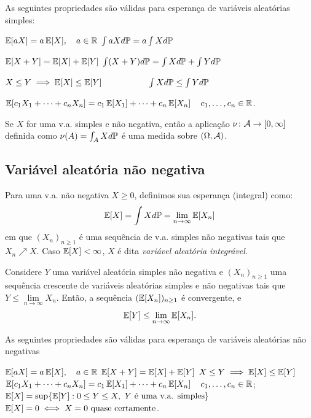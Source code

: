 \begin{theorem}
	As seguintes propriedades são válidas para esperança de variáveis aleatórias simples:
	\begin{outline}[enumerate]
		\1 \(\E[aX] = a\E[X], \quad a\in \Re\)
		\1[] \(\int aX d\P = a \int X d\P\)
		
		\1 \(\E[X+Y] = \E[X] + \E[Y]\)
		\1[] \(\int (X+Y) d\P = \int X d\P + \int Y d\P\)
		
		\1 \(X\leq Y \implies \E[X]\leq\E[Y]\)
		\1[] \(\quad\quad\quad\quad\quad \int X d\P \leq \int Y d\P\)
		
		\1 \(\E[c_1X_1 + \cdots + c_n X_n] = c_1\E[X_1] + \cdots + c_n\E[X_n]\, \quad c_1,\ldots,c_n\in\Re\).
	\end{outline}
\end{theorem}


\begin{theorem}
	Se $X$ for uma v.a. simples e não negativa, então a aplicação \(\mathmbox{\nu\colon \Acal \to [0, \infty]}\) definida como \(\nu(A) = \int_A X d\P\) é uma medida sobre $(\Omega, \Acal)$.
\end{theorem}

\subsection{Variável aleatória não negativa}

\begin{definition}
	Para uma v.a. não negativa $X\geq0$, definimos sua esperança (integral) como:
	\begin{equation}
		\E[X] = \int X d\P = \lim\limits_{n\to\infty}\E[X_n]
	\end{equation}
	em que $(X_n)_{n\geq1}$ é uma sequência de v.a. simples não negativas tais que \(X_n\nearrow X\). Caso \(\E[X]<\infty\), $X$ é dita \textit{variável aleatória integrável}.
\end{definition}

\begin{lemma}
	Considere $Y$ uma variável aleatória simples não negativa e $(X_n)_{n\geq1}$ uma sequência crescente de variáveis aleatórias simples e não negativas tais que $Y\leq \lim\limits_{n\to\infty}X_n$. Então, a sequência $(\E[X_n])_{n\geq1}$ é convergente, e
	\[
		\E[Y] \leq \lim\limits_{n\to\infty}\E[X_n].
	\]
\end{lemma}

\begin{theorem}
	As seguintes propriedades são válidas para esperança de variáveis aleatórias não negativas
	\begin{outline}[enumerate]
		\1 \(\E[aX] = a\E[X], \quad a\in \Re\)
		\1 \(\E[X+Y] = \E[X] + \E[Y]\)
		\1 \(X\leq Y \implies \E[X]\leq\E[Y]\)
		\1 \(\E[c_1X_1 + \cdots + c_n X_n] = c_1\E[X_1] + \cdots + c_n\E[X_n]\, \quad c_1,\ldots,c_n\in\Re\);
		\1 \(\E[X] = \sup\{\E[Y]: 0 \leq Y \leq X, \ Y \text{ é uma v.a. simples} \}\)
		\1 \( \E[X] = 0 \iff X=0 \text{ quase certamente}\).
	\end{outline}
\end{theorem}

